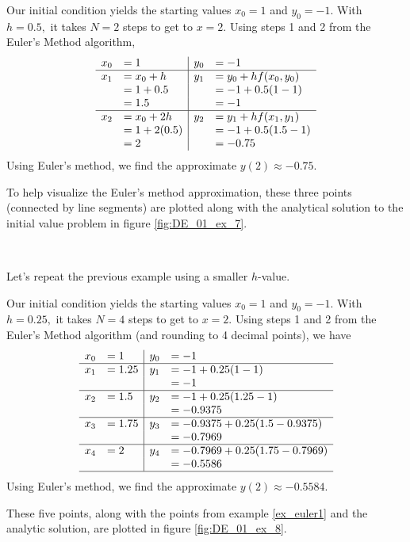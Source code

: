 {Our initial condition yields the starting values $x_0 = 1$ and $y_0 = -1$.  With $h = 0.5,$ it takes $N=2$ steps to get to $x=2.$  Using steps 1 and 2 from the Euler's Method algorithm,
\[
\begin{array}{rl | rl}
x_0  &= 1			& 	y_0	&= -1\\ \hline
x_1 	&= x_0 + h 	& 	y_1 	&= y_0 + hf(x_0,y_0)\\
	&= 1 + 0.5	 	&		&= -1 + 0.5(1 - 1)\\
	&= 1.5		&		&= -1\\ \hline
x_2	&= x_0 + 2h	&	y_2	&= y_1 + hf(x_1,y_1)\\
	&= 1 + 2(0.5)	&		&= -1 + 0.5(1.5 -1)\\
	&= 2			&		&= -0.75
\end{array}
\]
Using Euler's method, we find the approximate $y(2) \approx -0.75.$

To help visualize the Euler's method approximation, these three points (connected by line segments) are plotted along with the analytical solution to the initial value problem in figure \ref{fig:DE_01_ex_7}.
}\\


Let's repeat the previous example using a smaller $h$-value.\\

{Our initial condition yields the starting values $x_0 = 1$ and $y_0 = -1$.  With $h = 0.25,$ it takes $N=4$ steps to get to $x=2.$  Using steps 1 and 2 from the Euler's Method algorithm (and rounding to 4 decimal points), we have
\[
\begin{array}{rl | rl}
x_0  &= 1			& 	y_0	&= -1\\ \hline
x_1 	&= 1.25		&	y_1 	&= -1 + 0.25(1 - 1)\\
	&			&		&= -1\\ \hline
x_2 	&= 1.5 		& 	y_2 	&= -1 + 0.25(1.25-1)\\
	&			&		&= -0.9375\\ \hline
x_3	&= 1.75		&	y_3 	&= -0.9375 + 0.25(1.5-0.9375)\\
	&			&		&= -0.7969\\ \hline
x_4	&= 2			&	y_4	&= -0.7969 + 0.25(1.75 - 0.7969)\\
	&			&		&= -0.5586\\ \hline
\end{array}
\]
Using Euler's method, we find the approximate $y(2) \approx -0.5584.$

These five points, along with the points from example \ref{ex_euler1} and the analytic solution, are plotted in figure \ref{fig:DE_01_ex_8}.
}\\

